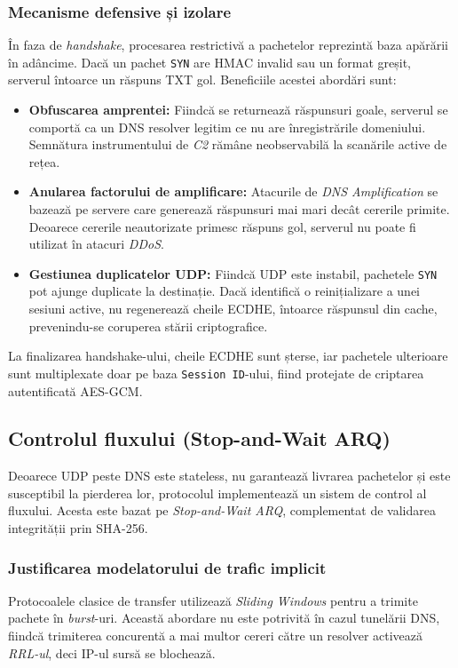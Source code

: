 \subsubsection{Mecanisme defensive și izolare}
În faza de \textit{handshake}, procesarea restrictivă a pachetelor reprezintă baza apărării în adâncime. Dacă un pachet \texttt{SYN} are HMAC invalid sau un format greșit, serverul întoarce un răspuns TXT gol. Beneficiile acestei abordări sunt:
\begin{itemize}
    \item \textbf{Obfuscarea amprentei:} Fiindcă se returnează răspunsuri goale, serverul se comportă ca un DNS resolver legitim ce nu are înregistrările domeniului. Semnătura instrumentului de \textit{C2} rămâne neobservabilă la scanările active de rețea.
    \item \textbf{Anularea factorului de amplificare:} Atacurile de \textit{DNS Amplification} se bazează pe servere care generează răspunsuri mai mari decât cererile primite. Deoarece cererile neautorizate primesc răspuns gol, serverul nu poate fi utilizat în atacuri \textit{DDoS}.
    \item \textbf{Gestiunea duplicatelor UDP:} Fiindcă UDP este instabil, pachetele \texttt{SYN} pot ajunge duplicate la destinație. Dacă identifică o reinițializare a unei sesiuni active, nu regenerează cheile ECDHE, întoarce răspunsul din cache, prevenindu-se coruperea stării criptografice.
\end{itemize}

La finalizarea handshake-ului, cheile ECDHE sunt șterse, iar pachetele ulterioare sunt multiplexate doar pe baza \texttt{Session ID}-ului, fiind protejate de criptarea autentificată AES-GCM.

\subsection{Controlul fluxului (Stop-and-Wait ARQ)}
Deoarece UDP peste DNS este stateless, nu garantează livrarea pachetelor și este susceptibil la pierderea lor, protocolul implementează un sistem de control al fluxului. Acesta este bazat pe \textit{Stop-and-Wait ARQ}, complementat de validarea integrității prin SHA-256.

\subsubsection{Justificarea modelatorului de trafic implicit}
Protocoalele clasice de transfer utilizează \textit{Sliding Windows} pentru a trimite pachete în \textit{burst}-uri. Această abordare nu este potrivită în cazul tunelării DNS, fiindcă trimiterea concurentă a mai multor cereri către un resolver activează \textit{RRL-ul}, deci IP-ul sursă se blochează. 

